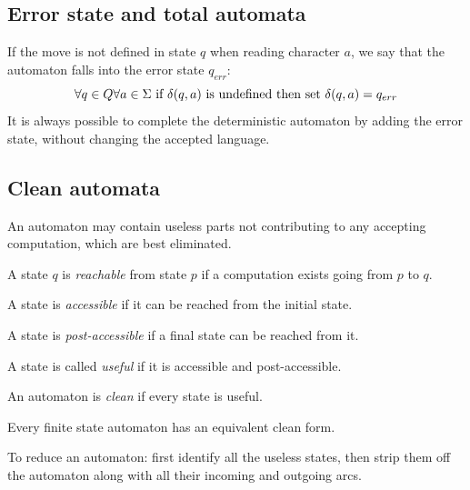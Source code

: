 \subsection*{Error state and total automata}
If the move is not defined in state $q$ when reading character $a$, we say that the automaton falls into the error state $q_{err}$:
\[\forall q \in Q \forall a \in \Sigma \textnormal{ if } \delta(q,a) \textnormal{ is undefined then set } \delta(q,a)=q_{err}\]
It is always possible to complete the deterministic automaton by adding the error state, without changing the accepted language. 

\subsection*{Clean automata}
An automaton may contain useless parts not contributing to any accepting computation, which are best eliminated.
\begin{definition}
    A state $q$ is \emph{reachable} from state $p$ if a computation exists going from $p$ to $q$.

    A state is \emph{accessible} if it can be reached from the initial state. 

    A state is \emph{post-accessible} if a final state can be reached from it. 

    A state is called \emph{useful} if it is accessible and post-accessible. 

    An automaton is \emph{clean} if every state is useful.
\end{definition}
\begin{property}
    Every finite state automaton has an equivalent clean form.
\end{property}    
To reduce an automaton: first identify all the useless states, then strip them off the automaton along with all their incoming and outgoing arcs. 

